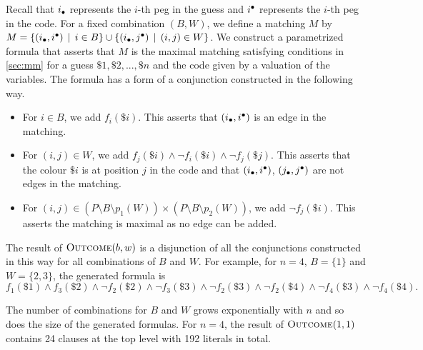 \begin{example}[Mastermind]
Recall that $i_\bullet$ represents the $i$-th peg in the guess
  and $i^\bullet$ represents the $i$-th peg in the code.
For a fixed combination $(B, W)$, we define a matching $M$ by
 $M = \{(i_\bullet, i^\bullet) \:\:|\:\: i\in B \} \cup
      \{(i_\bullet, j^\bullet) \:\:|\:\: (i, j)\in W \}$.
We construct a parametrized formula
  that asserts that $M$ is the maximal matching satisfying conditions in \autoref{sec:mm}
  for a guess $\$1,\$2,...,\$n$ and the code given by a valuation of the variables.
The formula has a form of a conjunction constructed in the following way.
\begin{itemize}
\item For $i\in B$, we add $f_i(\$i)$.
  This asserts that $(i_\bullet, i^\bullet)$ is an edge in the matching.
\item For $(i,j)\in W$, we add $f_j(\$i) \wedge \neg f_i(\$i) \wedge \neg f_j(\$j)$.
  This asserts that the colour $\$i$ is at position $j$ in the code and that
  $(i_\bullet, i^\bullet)$, $(j_\bullet, j^\bullet)$ are not edges
  in the matching.
\item For $(i,j)\in (P\setminus B\setminus p_1(W))
             \times (P\setminus B\setminus p_2(W))$, we add $\neg f_j(\$i)$.
  This asserts the matching is maximal as no edge can be added.
\end{itemize}

The result of $\textsc{Outcome}(b, w)$ is a disjunction
  of all the conjunctions constructed in this way
  for all combinations of $B$ and $W$.
For example, for $n = 4$, $B = \{1\}$ and $W = \{2, 3\}$, the generated formula is
\[ f_1(\$1) \wedge f_3(\$2) \wedge \neg f_2(\$2) \wedge \neg f_3(\$3)
  \wedge \neg f_2(\$3) \wedge \neg f_2(\$4) \wedge \neg f_4(\$3) \wedge \neg f_4(\$4). \]

The number of combinations for $B$ and $W$ grows exponentially
  with $n$ and so does the size of the generated formulas.
For $n = 4$, the result of $\textsc{Outcome}(1, 1)$
contains 24 clauses at the top level with 192 literals in total.\eqed




\end{example}
